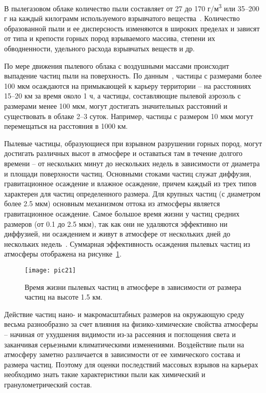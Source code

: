 В пылегазовом облаке количество пыли составляет от 27 до 170 г/м\textsuperscript{3} или 35–200 г на каждый килограмм используемого взрывчатого вещества~\cite{bib01}. Количество образованной пыли и ее дисперсность изменяются в широких пределах и зависят от типа и крепости горных пород взрываемого массива, степени их обводненности, удельного расхода взрывчатых веществ и др.

По мере движения пылевого облака с воздушными массами происходит выпадение частиц пыли на поверхность. По данным~\cite{bib06}, частицы с размерами более 100 мкм осаждаются на примыкающей к карьеру территории – на расстояниях 15–20 км за время около 1 ч, а частицы, составляющие пылевой аэрозоль с размерами менее 100 мкм, могут достигать значительных расстояний и существовать в облаке 2–3 суток. Например, частицы с размером 10 мкм могут перемещаться на расстояния в 1000 км.

Пылевые частицы, образующиеся при взрывном разрушении горных пород, могут достигать различных высот в атмосфере и оставаться там в течение долгого времени – от нескольких минут до нескольких недель в зависимости от диаметра и площади поверхности частиц. Основными стоками частиц служат диффузия, гравитационное осаждение и влажное осаждение, причем каждый из трех типов характерен для частиц определенного размера. Для крупных частиц (с диаметром более 2.5 мкм) основным механизмом оттока из атмосферы является гравитационное осаждение. Самое большое время жизни у частиц средних размеров (от 0.1 до 2.5 мкм), так как они не удаляются эффективно ни диффузией, ни осаждением и живут в атмосфере от нескольких дней до нескольких недель~\cite{bib08}. Суммарная эффективность осаждения пылевых частиц из атмосферы отображена на рисунке~\ref{img:2lifetime}. 

\begin{figure} [h] 
  \center
  \texttt{[image: pic21]}
  \caption{Время жизни пылевых частиц в атмосфере в зависимости от размера частиц на высоте 1.5 км.} 
  \label{img:2lifetime}  
\end{figure}

Действие частиц нано- и макромасштабных размеров на окружающую среду весьма разнообразно за счет влияния на физико-химические свойства атмосферы – начиная от ухудшения видимости из-за рассеяния и поглощения света и заканчивая серьезными климатическими изменениями. Воздействие пыли на атмосферу заметно различается в зависимости от ее химического состава и размера частиц. Поэтому для оценки последствий массовых взрывов на карьерах необходимо знать такие характеристики пыли как химический и гранулометрический состав. 

